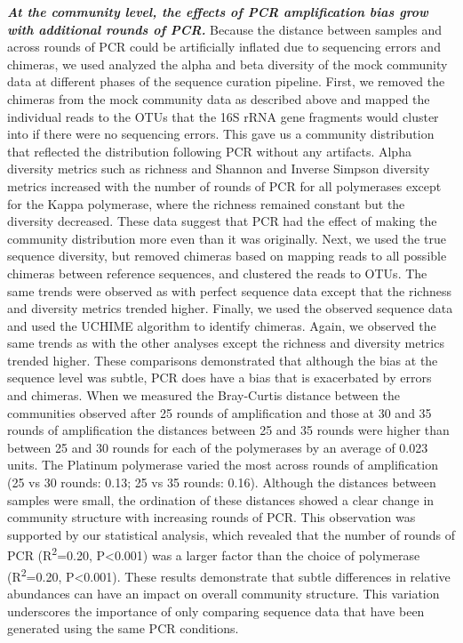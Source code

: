 \documentclass[11pt,]{article}
\begin{document}
\textbf{\emph{At the community level, the effects of PCR amplification
bias grow with additional rounds of PCR.}} Because the distance between
samples and across rounds of PCR could be artificially inflated due to
sequencing errors and chimeras, we used analyzed the alpha and beta
diversity of the mock community data at different phases of the sequence
curation pipeline. First, we removed the chimeras from the mock
community data as described above and mapped the individual reads to the
OTUs that the 16S rRNA gene fragments would cluster into if there were
no sequencing errors. This gave us a community distribution that
reflected the distribution following PCR without any artifacts. Alpha
diversity metrics such as richness and Shannon and Inverse Simpson
diversity metrics increased with the number of rounds of PCR for all
polymerases except for the Kappa polymerase, where the richness remained
constant but the diversity decreased. These data suggest that PCR had
the effect of making the community distribution more even than it was
originally. Next, we used the true sequence diversity, but removed
chimeras based on mapping reads to all possible chimeras between
reference sequences, and clustered the reads to OTUs. The same trends
were observed as with perfect sequence data except that the richness and
diversity metrics trended higher. Finally, we used the observed sequence
data and used the UCHIME algorithm to identify chimeras. Again, we
observed the same trends as with the other analyses except the richness
and diversity metrics trended higher. These comparisons demonstrated
that although the bias at the sequence level was subtle, PCR does have a
bias that is exacerbated by errors and chimeras. When we measured the
Bray-Curtis distance between the communities observed after 25 rounds of
amplification and those at 30 and 35 rounds of amplification the
distances between 25 and 35 rounds were higher than between 25 and 30
rounds for each of the polymerases by an average of 0.023 units. The
Platinum polymerase varied the most across rounds of amplification (25
vs 30 rounds: 0.13; 25 vs 35 rounds: 0.16). Although the distances
between samples were small, the ordination of these distances showed a
clear change in community structure with increasing rounds of PCR. This
observation was supported by our statistical analysis, which revealed
that the number of rounds of PCR (R\textsuperscript{2}=0.20,
P\textless{}0.001) was a larger factor than the choice of polymerase
(R\textsuperscript{2}=0.20, P\textless{}0.001). These results
demonstrate that subtle differences in relative abundances can have an
impact on overall community structure. This variation underscores the
importance of only comparing sequence data that have been generated
using the same PCR conditions.
\end{document}
